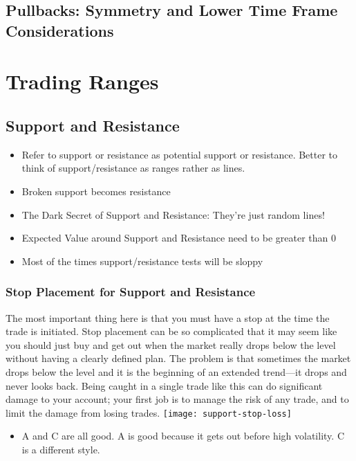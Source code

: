 \documentclass{../notes}
\begin{document}
\subsection{Pullbacks: Symmetry and Lower Time Frame Considerations}


\section{Trading Ranges}
\subsection{Support and Resistance}
\begin{itemize}
  \item Refer to support or resistance as potential support or resistance. Better to think of support/resistance as ranges rather as lines.
  \item Broken support becomes resistance
  \item The Dark Secret of Support and Resistance: They're just random lines!
  \item Expected Value around Support and Resistance need to be greater than 0
  \item Most of the times support/resistance tests will be sloppy
\end{itemize}
\subsubsection{Stop Placement for Support and Resistance}
The most important thing here is that you must have a stop at the time the trade is initiated. Stop placement can be so complicated that it may seem like you should just buy and get out when the market really drops below the level without having a clearly defined plan. The problem is that sometimes the market drops below the level and it is the beginning of an extended trend—it drops and never looks back. Being caught in a single trade like this can do significant damage to your account; your first job is to manage the risk of any trade, and to limit the damage from losing trades.
\texttt{[image: support-stop-loss]}
\begin{itemize}
  \item A and C are all good. A is good because it gets out before high volatility. C is a different style.
\end{itemize}
\end{document}

